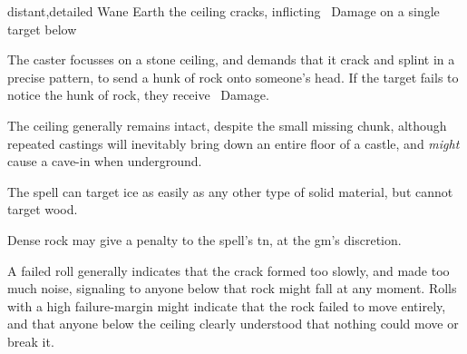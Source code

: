   {distant,detailed}%
  {Wane}%
  {Earth}%
  {}%
  {the ceiling cracks, inflicting \showDam\ Damage on a single target below}%
  {
    The caster focusses on a stone ceiling, and demands that it crack and splint in a precise pattern, to send a hunk of rock onto someone's head.
    If the target fails to notice the hunk of rock, they receive \showDam\ Damage.

    The ceiling generally remains intact, despite the small missing chunk, although repeated castings will inevitably bring down an entire floor of a castle, and \emph{might} cause a cave-in when underground.

    The spell can target ice as easily as any other type of solid material, but cannot target wood.

    Dense rock may give a penalty to the spell's \gls{tn}, at the \gls{gm}'s discretion.

    A failed roll generally indicates that the crack formed too slowly, and made too much noise, signaling to anyone below that rock might fall at any moment.
    Rolls with a high failure-margin might indicate that the rock failed to move entirely, and that anyone below the ceiling clearly understood that nothing could move or break it.
  }

